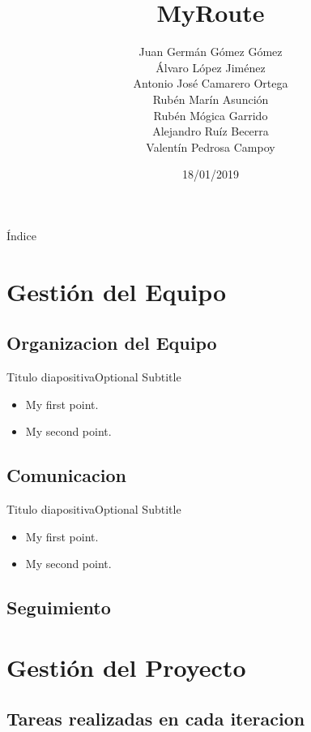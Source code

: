 \documentclass{beamer}
\title{MyRoute}
\subtitle { \vspace{1cm} \color{black}Juan Germ\'an G\'omez G\'omez \\ \'Alvaro L\'opez Jim\'enez \\ Antonio Jos\'e Camarero Ortega \\ Rub\'en Mar\'in Asunci\'on \\ Rub\'en M\'ogica Garrido \\ Alejandro Ru\'iz Becerra \\ Valent\'in Pedrosa Campoy}
\date{18/01/2019}
\begin{document}
\begin{frame}
  \titlepage 
\end{frame}

\begin{frame}{\'Indice}
  \tiny
 
  \tableofcontents
\end{frame}

\section{Gesti\'on del Equipo}

\subsection{Organizacion del Equipo}

\begin{frame}{Titulo diapositiva}{Optional Subtitle}
  \begin{itemize}
  \item {
    My first point.
  }
  \item {
    My second point.
  }
  \end{itemize}
\end{frame}

\subsection{Comunicacion}

\begin{frame}{Titulo diapositiva}{Optional Subtitle}
  \begin{itemize}
  \item {
    My first point.
  }
  \item {
    My second point.
  }
  \end{itemize}
\end{frame}

\subsection{Seguimiento}

\section{Gesti\'on del Proyecto}

\subsection{Tareas realizadas en cada iteracion}
\end{document}
